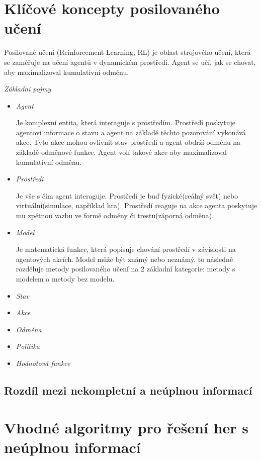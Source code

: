 \section{Klíčové koncepty posilovaného učení}
Posilované učení (Reinforcement Learning, RL) je oblast strojového učení, která se zaměřuje na učení agentů v dynamickém prostředí. Agent se učí, jak se chovat, aby maximalizoval kumulativní odměnu.

\emph{Základní pojmy}
\begin{itemize}
  \item \emph{Agent}
  
  Je komplexní entita, která interaguje s prostředím.
  Prostředí poskytuje agentovi informace o stavu a agent na základě těchto pozorování vykonává akce.
  Tyto akce mohou ovlivnit stav prostředí a agent obdrží odměnu na základě odměnové funkce.
  Agent volí takové akce aby maximalizoval kumulativní odměnu.

  \item \emph{Prostředí}
  
  Je vše s čím agent interaguje.
  Prostředí je buď fyzické(reálný svět) nebo virtuální(simulace, například hra).
  Prostředí reaguje na akce agenta poskytuje mu zpětnou vazbu ve formě odměny či trestu(záporná odměna).

  \item \emph{Model}
  
  Je matematická funkce, která popisuje chování prostředí v závislosti na agentových akcích.
  Model může být známý nebo neznámý, to následně rozděluje metody posilovaného učení na 2 základní kategorie: metody s modelem a metody bez modelu.

  \item \emph{Stav}
  \item \emph{Akce}
  \item \emph{Odměna}
  \item \emph{Politika}
  \item \emph{Hodnotová funkce}
\end{itemize}


\subsection*{Rozdíl mezi nekompletní a neúplnou informací}


\section{Vhodné algoritmy pro řešení her s neúplnou informací}

